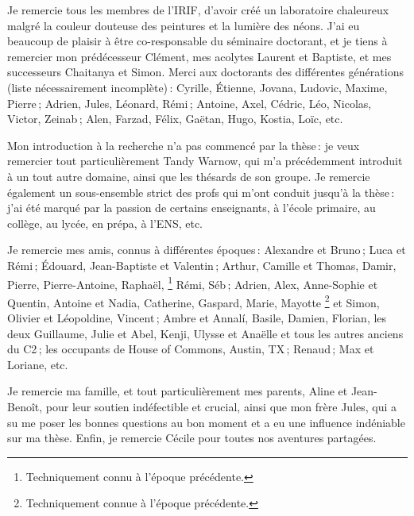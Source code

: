 Je remercie tous les membres de l'IRIF, d'avoir cr\'e\'e un laboratoire chaleureux malgr\'e la couleur douteuse des peintures et la lumi\`ere des n\'eons.
J'ai eu beaucoup de plaisir \`a \^etre co-responsable du s\'eminaire doctorant, et je tiens \`a remercier mon pr\'ed\'ecesseur Cl\'ement, mes acolytes Laurent et Baptiste, et mes successeurs Chaitanya et Simon.
Merci aux doctorants des diff\'erentes g\'en\'erations (liste n\'ecessairement incompl\`ete)\,: Cyrille, \'Etienne, Jovana, Ludovic, Maxime, Pierre\,; Adrien, Jules, L\'eonard, R\'emi\,; Antoine, Axel, C\'edric, L\'eo, Nicolas, Victor, Zeinab\,; Alen, Farzad, F\'elix, Ga\"etan, Hugo, Kostia, Lo\"ic, etc.

Mon introduction \`a la recherche n'a pas commenc\'e par la th\`ese\,: je veux remercier tout particuli\`erement Tandy Warnow, qui m'a pr\'ec\'edemment introduit \`a un tout autre domaine, ainsi que les th\'esards de son groupe.
Je remercie \'egalement un sous-ensemble strict des profs qui m'ont conduit jusqu'\`a la th\`ese\,: j'ai \'et\'e marqu\'e par la passion de certains enseignants, \`a l'\'ecole primaire, au coll\`ege, au lyc\'ee, en pr\'epa, \`a l'ENS, etc.

Je remercie mes amis, connus \`a diff\'erentes \'epoques\,: Alexandre et Bruno\,; Luca et R\'emi\,; \'Edouard, Jean-Baptiste et Valentin\,; Arthur, Camille et Thomas, Damir, Pierre, Pierre-Antoine, Rapha\"el,%
\footnote{
    Techniquement connu \`a l'\'epoque pr\'ec\'edente.
}
R\'emi, S\'eb\,; Adrien, Alex, Anne-Sophie et Quentin, Antoine et Nadia, Catherine, Gaspard, Marie, Mayotte%
\footnote{
    Techniquement connue \`a l'\'epoque pr\'ec\'edente.
}
et Simon, Olivier et L\'eopoldine, Vincent\,; Ambre et Annal\'i, Basile, Damien, Florian, les deux Guillaume, Julie et Abel, Kenji, Ulysse et Ana\"elle et tous les autres anciens du C2\,;
les occupants de House of Commons, Austin, TX\,; Renaud\,; Max et Loriane, etc.

Je remercie ma famille, et tout particuli\`erement mes parents, Aline et Jean-Beno\^it, pour leur soutien ind\'efectible et crucial, ainsi que mon fr\`ere Jules, qui a su me poser les bonnes questions au bon moment et a eu une influence ind\'eniable sur ma th\`ese.
Enfin, je remercie C\'ecile pour toutes nos aventures partag\'ees.

\clearpage
